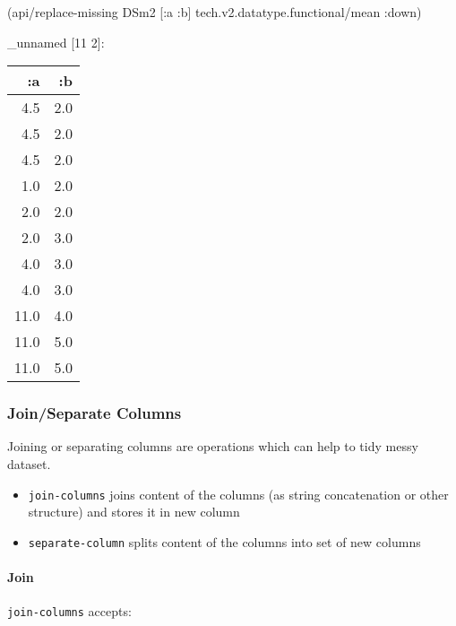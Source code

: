 \documentclass[]{article}
\newenvironment{Shaded}{\begin{snugshade}}{\end{snugshade}}
\newcommand{\AttributeTok}[1]{\textcolor[rgb]{0.77,0.63,0.00}{#1}}
\newcommand{\NormalTok}[1]{#1}
\providecommand{\tightlist}{%
  \setlength{\itemsep}{0pt}\setlength{\parskip}{0pt}}
\let\oldparagraph\paragraph
\renewcommand{\paragraph}[1]{\oldparagraph{#1}\mbox{}}
\begin{document}
\begin{Shaded}
\begin{Highlighting}[]
\NormalTok{(api/replace-missing DSm2 [}\AttributeTok{:a} \AttributeTok{:b}\NormalTok{] tech.v2.datatype.functional/mean }\AttributeTok{:down}\NormalTok{)}
\end{Highlighting}
\end{Shaded}

\_unnamed {[}11 2{]}:

\begin{longtable}[]{@{}rr@{}}
\toprule
:a & :b\tabularnewline
\midrule
\endhead
4.5 & 2.0\tabularnewline
4.5 & 2.0\tabularnewline
4.5 & 2.0\tabularnewline
1.0 & 2.0\tabularnewline
2.0 & 2.0\tabularnewline
2.0 & 3.0\tabularnewline
4.0 & 3.0\tabularnewline
4.0 & 3.0\tabularnewline
11.0 & 4.0\tabularnewline
11.0 & 5.0\tabularnewline
11.0 & 5.0\tabularnewline
\bottomrule
\end{longtable}

\subsubsection{Join/Separate Columns}\label{joinseparate-columns}

Joining or separating columns are operations which can help to tidy
messy dataset.

\begin{itemize}
\tightlist
\item
  \texttt{join-columns} joins content of the columns (as string
  concatenation or other structure) and stores it in new column
\item
  \texttt{separate-column} splits content of the columns into set of new
  columns
\end{itemize}

\paragraph{Join}\label{join}

\texttt{join-columns} accepts:
\end{document}
